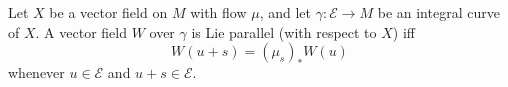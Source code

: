 Let $X$ be a vector field on $M$ with flow $\mu$, and let $\gamma: \mathcal{E} \rightarrow M$ be an integral curve of $X$. A vector field $W$ over $\gamma$ is Lie parallel (with respect to $X$) iff
$$W(u + s) = (\mu_s)_* W(u)$$
whenever $u \in \mathcal{E}$ and $u + s \in \mathcal{E}$.
